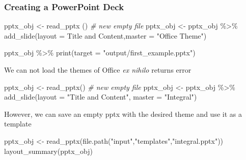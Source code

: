 \documentclass[
]{book}
\newenvironment{Shaded}{\begin{snugshade}}{\end{snugshade}}
\newcommand{\AttributeTok}[1]{\textcolor[rgb]{0.77,0.63,0.00}{#1}}
\newcommand{\CommentTok}[1]{\textcolor[rgb]{0.56,0.35,0.01}{\textit{#1}}}
\newcommand{\FunctionTok}[1]{\textcolor[rgb]{0.00,0.00,0.00}{#1}}
\newcommand{\NormalTok}[1]{#1}
\newcommand{\OtherTok}[1]{\textcolor[rgb]{0.56,0.35,0.01}{#1}}
\newcommand{\SpecialCharTok}[1]{\textcolor[rgb]{0.00,0.00,0.00}{#1}}
\newcommand{\StringTok}[1]{\textcolor[rgb]{0.31,0.60,0.02}{#1}}
\begin{document}
\hypertarget{creating-a-powerpoint-deck}{%
\subsubsection{Creating a PowerPoint Deck}\label{creating-a-powerpoint-deck}}

\begin{Shaded}
\begin{Highlighting}[]
\NormalTok{pptx\_obj }\OtherTok{\textless{}{-}} \FunctionTok{read\_pptx}\NormalTok{ () }\CommentTok{\# new empty file}
\NormalTok{pptx\_obj }\OtherTok{\textless{}{-}}\NormalTok{ pptx\_obj }\SpecialCharTok{\%\textgreater{}\%} 
  \FunctionTok{add\_slide}\NormalTok{(}\AttributeTok{layout  =} \StringTok{\textquotesingle{}Title and Content\textquotesingle{}}\NormalTok{,}\AttributeTok{master =} \StringTok{"Office Theme"}\NormalTok{)}

\NormalTok{pptx\_obj }\SpecialCharTok{\%\textgreater{}\%} \FunctionTok{print}\NormalTok{(}\AttributeTok{target =} \StringTok{"output/first\_example.pptx"}\NormalTok{)}
\end{Highlighting}
\end{Shaded}

We can not load the themes of Office \emph{ex nihilo} returns error

\begin{Shaded}
\begin{Highlighting}[]
\NormalTok{pptx\_obj }\OtherTok{\textless{}{-}} \FunctionTok{read\_pptx}\NormalTok{() }\CommentTok{\# new empty file}
\NormalTok{pptx\_obj }\OtherTok{\textless{}{-}}\NormalTok{ pptx\_obj }\SpecialCharTok{\%\textgreater{}\%} 
  \FunctionTok{add\_slide}\NormalTok{(}\AttributeTok{layout =} \StringTok{"Title and Content"}\NormalTok{, }\AttributeTok{master =} \StringTok{"Integral"}\NormalTok{)}
\end{Highlighting}
\end{Shaded}

However, we can save an empty pptx with the desired theme and use it as a template

\begin{Shaded}
\begin{Highlighting}[]
\NormalTok{pptx\_obj }\OtherTok{\textless{}{-}} \FunctionTok{read\_pptx}\NormalTok{(}\FunctionTok{file.path}\NormalTok{(}\StringTok{"input"}\NormalTok{,}\StringTok{"templates"}\NormalTok{,}\StringTok{"integral.pptx"}\NormalTok{))}
\FunctionTok{layout\_summary}\NormalTok{(pptx\_obj)}
\end{Highlighting}
\end{Shaded}
\end{document}
